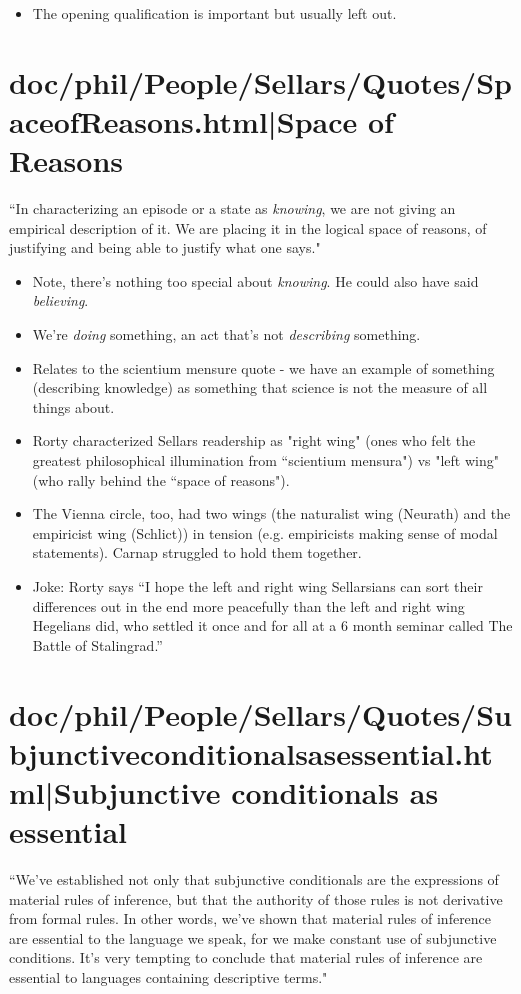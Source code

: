 \documentclass[12pt,a4paper]{report}
\begin{document}
\cite{sellars1956empiricism}

\begin{itemize}
    \item The opening qualification is important but usually left out.
\end{itemize}

\chapter{doc/phil/People/Sellars/Quotes/SpaceofReasons.html|Space of Reasons}
``In characterizing an episode or a state as \emph{knowing}, we are not giving an empirical description of it. We are placing it in the logical space of reasons, of justifying and being able to justify what one says." \cite{sellars1956empiricism}
    \begin{itemize}
        \item Note, there's nothing too special about \emph{knowing}. He could also have said \emph{believing}.
        \item  We're \emph{doing} something, an act that's not \emph{describing} something.
        \item Relates to the scientium mensure quote - we have an example of something (describing knowledge) as something that science is not the measure of all things about.
        \item Rorty characterized Sellars readership as "right wing" (ones who felt the greatest philosophical illumination from ``scientium mensura") vs "left wing" (who rally behind the ``space of reasons").
        \item The Vienna circle, too, had two wings (the naturalist wing (Neurath) and the empiricist wing (Schlict)) in tension (e.g. empiricists making sense of modal statements). Carnap struggled to hold them together.
        \item Joke: Rorty says ``I hope the left and right wing Sellarsians can sort their differences out in the end more peacefully than the left and right wing Hegelians did, who settled it once and for all at a 6 month seminar called The Battle of Stalingrad.''
    \end{itemize}
\chapter{doc/phil/People/Sellars/Quotes/Subjunctiveconditionalsasessential.html|Subjunctive conditionals as essential}
``We've established not only that subjunctive conditionals are the expressions of material rules of inference, but that the authority of those rules is not derivative from formal rules. In other words, we've shown that material rules of inference are essential to the language we speak, for we make constant use of subjunctive conditions. It's very tempting to conclude that material rules of inference are essential to languages containing descriptive terms."
\end{document}
